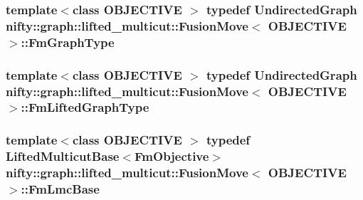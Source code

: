\subsubsection[{Fm\+Graph\+Type}]{\setlength{\rightskip}{0pt plus 5cm}template$<$class O\+B\+J\+E\+C\+T\+I\+V\+E $>$ typedef {\bf Undirected\+Graph} {\bf nifty\+::graph\+::lifted\+\_\+multicut\+::\+Fusion\+Move}$<$ O\+B\+J\+E\+C\+T\+I\+V\+E $>$\+::{\bf Fm\+Graph\+Type}}\label{classnifty_1_1graph_1_1lifted__multicut_1_1FusionMove_a673b31d12a14cc0303334d17ac46a0db}
\hypertarget{classnifty_1_1graph_1_1lifted__multicut_1_1FusionMove_a069f82dc2713d636a830b97dc82da08a}{}
\subsubsection[{Fm\+Lifted\+Graph\+Type}]{\setlength{\rightskip}{0pt plus 5cm}template$<$class O\+B\+J\+E\+C\+T\+I\+V\+E $>$ typedef {\bf Undirected\+Graph} {\bf nifty\+::graph\+::lifted\+\_\+multicut\+::\+Fusion\+Move}$<$ O\+B\+J\+E\+C\+T\+I\+V\+E $>$\+::{\bf Fm\+Lifted\+Graph\+Type}}\label{classnifty_1_1graph_1_1lifted__multicut_1_1FusionMove_a069f82dc2713d636a830b97dc82da08a}
\hypertarget{classnifty_1_1graph_1_1lifted__multicut_1_1FusionMove_aa22a440b84a78fb5651a35b006177c30}{}
\subsubsection[{Fm\+Lmc\+Base}]{\setlength{\rightskip}{0pt plus 5cm}template$<$class O\+B\+J\+E\+C\+T\+I\+V\+E $>$ typedef {\bf Lifted\+Multicut\+Base}$<${\bf Fm\+Objective}$>$ {\bf nifty\+::graph\+::lifted\+\_\+multicut\+::\+Fusion\+Move}$<$ O\+B\+J\+E\+C\+T\+I\+V\+E $>$\+::{\bf Fm\+Lmc\+Base}}\label{classnifty_1_1graph_1_1lifted__multicut_1_1FusionMove_aa22a440b84a78fb5651a35b006177c30}
\hypertarget{classnifty_1_1graph_1_1lifted__multicut_1_1FusionMove_ac2b4a0ecbc324dd7b5b4a7805c714aae}{}
